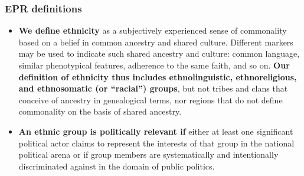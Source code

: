 \documentclass[aspectratio=43]{beamer}
\begin{document}
\begin{frame}
\frametitle{EPR definitions}
\centering

{\small
\begin{itemize}
  \item \textbf{We define ethnicity} as a subjectively experienced sense of commonality based on a belief in common ancestry and shared culture. Different markers may be used to indicate such shared ancestry and culture: common language, similar phenotypical features, adherence to the same faith, and so on. \textbf{Our definition of ethnicity thus includes ethnolinguistic, ethnoreligious, and ethnosomatic (or “racial”) groups}, but not tribes and clans that conceive of ancestry in genealogical terms, nor regions that do not define commonality on the basis of shared ancestry.

  \item \textbf{An ethnic group is politically relevant if} either at least one significant political actor claims to represent the interests of that group in the national political arena or if group members are systematically and intentionally discriminated against in the domain of public politics.
\end{itemize}
}

\end{frame}
\end{document}
